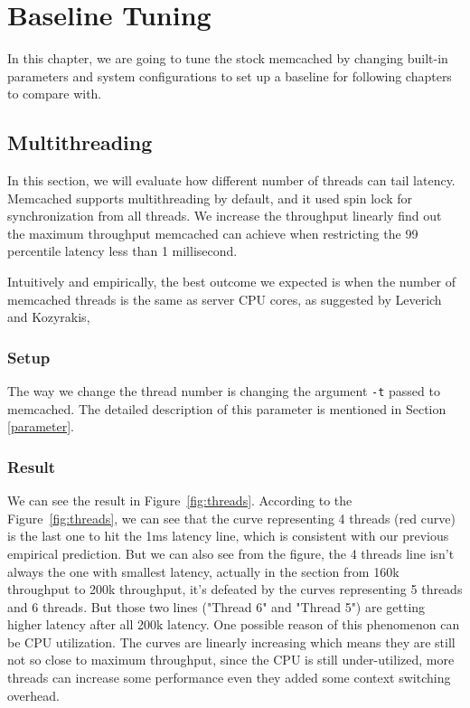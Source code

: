 \documentclass[bsc,frontabs,twoside,singlespacing,parskip,deptreport]{infthesis}     %
\begin{document}
\chapter{Baseline Tuning}
In this chapter, we are going to tune the stock memcached by changing built-in parameters and system configurations to set up a baseline for following chapters to compare with.

\section{Multithreading}

In this section, we will evaluate how different number of threads can tail latency. Memcached supports multithreading by default, and it used spin lock %
for synchronization from all threads. We increase the throughput linearly find out the maximum throughput memcached can achieve when restricting the 99 percentile latency less than 1 millisecond. 


Intuitively and empirically, the best outcome we expected is when the number of memcached threads is the same as server CPU cores, as suggested by Leverich and Kozyrakis\cite{DBLP:conf/eurosys/LeverichK14},



\subsection{Setup}
The way we change the thread number is changing the argument \texttt{-t} passed to memcached. The detailed description of this parameter is mentioned in Section \ref{parameter}. 

\subsection{Result}
We can see the result in Figure~\ref{fig:threads}. According to the Figure~\ref{fig:threads}, we can see that the curve representing 4 threads (red curve) is the last one to hit the 1ms latency line, which is consistent with our previous empirical prediction. But we can also see from the figure, the 4 threads line isn't always the one with smallest latency, actually in the section from 160k throughput to 200k throughput, it's defeated by the curves representing 5 threads and 6 threads. But those two lines ("Thread 6" and "Thread 5") are getting higher latency after all 200k latency. One possible reason of this phenomenon can be CPU utilization. The curves are linearly increasing which means they are still not so close to maximum throughput, since the CPU is still under-utilized, more threads can increase some performance even they added some context switching overhead.
\end{document}
